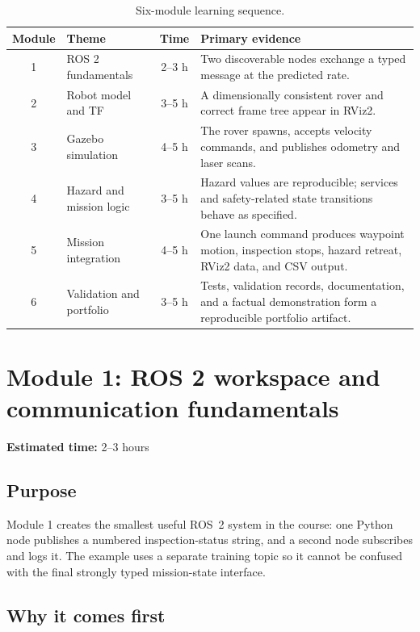 \documentclass[11pt]{article}
\begin{document}
\begin{table}[htbp]
\centering
\small
\begin{tabularx}{\textwidth}{@{}c l c X@{}}
\toprule
\textbf{Module} & \textbf{Theme} & \textbf{Time} & \textbf{Primary evidence} \\
\midrule
1 & ROS 2 fundamentals & 2--3 h
  & Two discoverable nodes exchange a typed message at the predicted rate. \\
2 & Robot model and TF & 3--5 h
  & A dimensionally consistent rover and correct frame tree appear in RViz2. \\
3 & Gazebo simulation & 4--5 h
  & The rover spawns, accepts velocity commands, and publishes odometry and
    laser scans. \\
4 & Hazard and mission logic & 3--5 h
  & Hazard values are reproducible; services and safety-related state
    transitions behave as specified. \\
5 & Mission integration & 4--5 h
  & One launch command produces waypoint motion, inspection stops, hazard
    retreat, RViz2 data, and CSV output. \\
6 & Validation and portfolio & 3--5 h
  & Tests, validation records, documentation, and a factual demonstration form
    a reproducible portfolio artifact. \\
\bottomrule
\end{tabularx}
\caption{Six-module learning sequence.}
\end{table}

\newpage
\section{Module 1: ROS 2 workspace and communication fundamentals}

\textbf{Estimated time:} 2--3 hours

\subsection{Purpose}

Module 1 creates the smallest useful ROS~2 system in the course: one Python node
publishes a numbered inspection-status string, and a second node subscribes and
logs it. The example uses a separate training topic so it cannot be confused
with the final strongly typed mission-state interface.

\subsection{Why it comes first}
\end{document}
